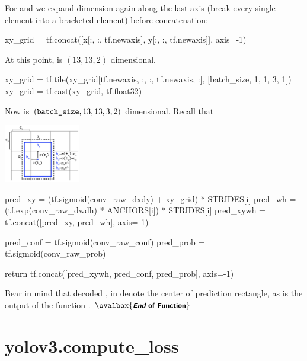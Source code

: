 \documentclass[10pt,a4paper]{article}
\newcommand{\END}{\text{}\hfill$\ovalbox{\small\text{\bfseries\sffamily {\itshape End} of Function}}$\bigskip}
\begin{document}
For  and  we expand dimension again along the last axis (break every single element into a bracketed element) before concatenation:
\begin{py}
    xy_grid = tf.concat([x[:, :, tf.newaxis], y[:, :, tf.newaxis]], axis=-1)
\end{py}
At this point,  is $(13,13,2)$ dimensional.
\begin{py}
    xy_grid = tf.tile(xy_grid[tf.newaxis, :, :, tf.newaxis, :], [batch_size, 1, 1, 3, 1])
    xy_grid = tf.cast(xy_grid, tf.float32)
\end{py}
Now  is $(\code{batch_size}, 13, 13, 3, 2)$ dimensional. Recall that 
\begin{center}
\includegraphics[width=0.25\textwidth]{./decode_anchor.png}
\end{center}
\begin{py}
    pred_xy = (tf.sigmoid(conv_raw_dxdy) + xy_grid) * STRIDES[i]
    pred_wh = (tf.exp(conv_raw_dwdh) * ANCHORS[i]) * STRIDES[i]
    pred_xywh = tf.concat([pred_xy, pred_wh], axis=-1)

    pred_conf = tf.sigmoid(conv_raw_conf)
    pred_prob = tf.sigmoid(conv_raw_prob)

    return tf.concat([pred_xywh, pred_conf, pred_prob], axis=-1)
\end{py}
Bear in mind that decoded ,  in  denote the center of prediction rectangle, as is the output of the function . \END



\section{yolov3.compute\_loss}
\end{document}
